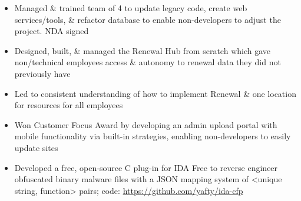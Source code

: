\documentclass[10pt,a4paper,ragged2e]{altacv}
\begin{document}
\tagline{}


\begin{fullwidth}
\makecvheader
\end{fullwidth}



\begin{itemize}
\item {Managed \& trained team of 4 to update legacy code, create web services/tools, \& refactor database to enable non-developers to adjust the project. NDA signed}
\end{itemize}

\divider \newline
{}
\begin{itemize}
\item {Designed, built, \& managed the Renewal Hub from scratch which gave non/technical employees access \& autonomy to renewal data they did not previously have}
\smallskip
\item{Led to consistent understanding of how to implement Renewal \& one location for resources for all employees}
\smallskip
\item{Won Customer Focus Award by developing an admin upload portal with mobile functionality via built-in strategies, enabling non-developers to easily update sites}
\end{itemize}

\divider \newline
{}
\begin{itemize}
\item {Developed a free, open-source C plug-in for IDA Free to reverse engineer obfuscated binary malware files with a JSON mapping system of <unique string, function> pairs; code: {\href{https://github.com/yafty/ida-cfp}{https://github.com/yafty/ida-cfp}}}
\end{itemize}
\end{document}
